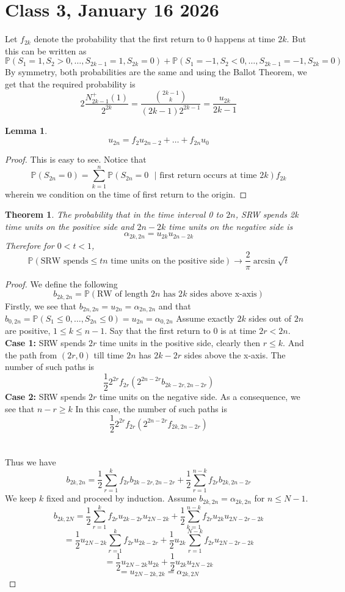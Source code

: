 \documentclass{article}
\newtheorem{theorem}{Theorem}
\newtheorem{lemma}{Lemma}
\begin{document}
\section*{Class 3, January 16 2026}
    Let $f_{2k}$ denote the probability that the first return to 0 happens at time $2k$.
    But this can be written as
    $$\mathbb{P}(S_1=1,S_2>0,\dots,S_{2k-1}=1,S_{2k}=0)+\mathbb{P}(S_1=-1,S_2<0,\dots,S_{2k-1}=-1,S_{2k}=0)$$
By symmetry, both probabilities are the same and using the Ballot Theorem, we get that the required probability is
$$2\frac{N^{+}_{2k-1}(1)}{2^{2k}}=\frac{\binom{2k-1}{k}}{(2k-1)2^{2k-1}}=\frac{u_{2k}}{2k-1}$$
\begin{lemma}
    $$u_{2n}=f_2 u_{2n-2}+\dots+f_{2n}u_0$$
\end{lemma}
\begin{proof}
This is easy to see. Notice that
$$\mathbb{P}(S_{2n}=0)=\sum_{k=1}^{n}\mathbb{P}(S_{2n}=0 \text{ }|\text{ first return occurs at time 2}k)f_{2k}$$
wherein we condition on the time of first return to the origin.
\end{proof}
\begin{theorem}
The probability that in the time interval 0 to $2n$, SRW spends 2k time units on the positive side and $2n-2k$ time units on the negative side is $$\alpha_{2k,2n}=u_{2k}u_{2n-2k}$$
Therefore for $0<t<1$, 
$$\mathbb{P}(\text{SRW spends}\leq tn \text{ time units on the positive side})\to \frac{2}{\pi}\arcsin{\sqrt{t}}$$
\end{theorem}
\begin{proof}
 We define the following
 $$b_{2k,2n}=\mathbb{P}(\text{RW of length 2}n\text{ has 2}k\text{ sides above x-axis})$$   
Firstly, we see that $b_{2n,2n}=u_{2n}=\alpha_{2n,2n}$ and that $b_{0,2n}=\mathbb{P}(S_1\leq 0,\dots,S_{2n}\leq 0)=u_{2n}=\alpha_{0,2n}$
Assume exactly $2k$ sides out of $2n$ are positive, $1\leq k \leq n-1$. Say that the first return to 0 is at time $2r<2n$. \\
\textbf{Case 1:} SRW spends $2r$ time units in the positive side, clearly then $r\leq k$. And the path from $(2r,0)$ till time $2n$ has $2k-2r$ sides above the x-axis.
The number of such paths is 
$$\frac{1}{2}2^{2r}f_{2r}(2^{2n-2r}b_{2k-2r,2n-2r})$$
\textbf{Case 2:} SRW spends $2r$ time units on the negative side. As a consequence, we see that $n-r\geq k$
In this case, the number of such paths is
$$\frac{1}{2}2^{2r}f_{2r}(2^{2n-2r}f_{2k,2n-2r})$$\\ \\

Thus we have 
$$b_{2k,2n}=\frac{1}{2}\sum_{r=1}^{k}f_{2r}b_{2k-2r,2n-2r}+\frac{1}{2}\sum_{r=1}^{n-k}f_{2r}b_{2k,2n-2r}$$
We keep $k$ fixed and proceed by induction. Assume $b_{2k,2n}=\alpha_{2k,2n}$ for $n\leq N-1$.\\
$$b_{2k,2N}=\frac{1}{2}\sum_{r=1}^{k}f_{2r}u_{2k-2r}u_{2N-2k}+\frac{1}{2}\sum_{k=1}^{n-k}f_{2r}u_{2k}u_{2N-2r-2k}$$
$$=\frac{1}{2}u_{2N-2k}\sum_{r=1}^{k}f_{2r}u_{2k-2r}+\frac{1}{2}u_{2k}\sum_{r=1}^{N-k}f_{2r}u_{2N-2r-2k}$$
$$=\frac{1}{2}u_{2N-2k}u_{2k}+\frac{1}{2}u_{2k}u_{2N-2k}$$
$$=u_{2N-2k,2k}=\alpha_{2k,2N}$$
\end{proof}
\end{document}
